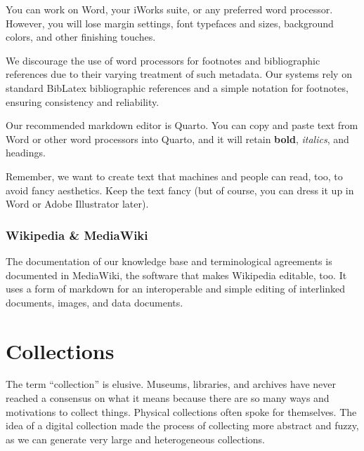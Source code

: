 \documentclass[
  letterpaper,
  DIV=11,
  numbers=noendperiod]{scrreprt}
\begin{document}
\begin{tcolorbox}[enhanced jigsaw, opacityback=0, bottomrule=.15mm, rightrule=.15mm, toptitle=1mm, breakable, colbacktitle=quarto-callout-tip-color!10!white, colback=white, title=\textcolor{quarto-callout-tip-color}{\faLightbulb}\hspace{0.5em}{Using Word or Works}, leftrule=.75mm, toprule=.15mm, left=2mm, arc=.35mm, colframe=quarto-callout-tip-color-frame, coltitle=black, titlerule=0mm, bottomtitle=1mm, opacitybacktitle=0.6]

You can work on Word, your iWorks suite, or any preferred word
processor. However, you will lose margin settings, font typefaces and
sizes, background colors, and other finishing touches.

We discourage the use of word processors for footnotes and bibliographic
references due to their varying treatment of such metadata. Our systems
rely on standard BibLatex bibliographic references and a simple notation
for footnotes, ensuring consistency and reliability.

Our recommended markdown editor is Quarto. You can copy and paste text
from Word or other word processors into Quarto, and it will retain
\textbf{bold}, \emph{italics}, and headings.

Remember, we want to create text that machines and people can read, too,
to avoid fancy aesthetics. Keep the text fancy (but of course, you can
dress it up in Word or Adobe Illustrator later).

\end{tcolorbox}

\subsection{Wikipedia \& MediaWiki}\label{wikipedia-mediawiki}

The documentation of our knowledge base and terminological agreements is
documented in MediaWiki, the software that makes Wikipedia editable,
too. It uses a form of markdown for an interoperable and simple editing
of interlinked documents, images, and data documents.


\chapter{Collections}\label{sec-collections}

The term ``collection'' is elusive. Museums, libraries, and archives
have never reached a consensus on what it means because there are so
many ways and motivations to collect things. Physical collections often
spoke for themselves. The idea of a digital collection made the process
of collecting more abstract and fuzzy, as we can generate very large and
heterogeneous collections.
\end{document}
